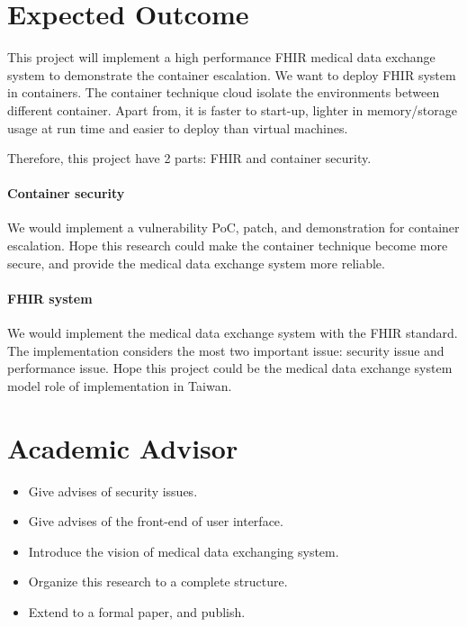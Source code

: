 \documentclass[12pt,a4paper]{IEEEconf}
\begin{document}

\section{Expected Outcome}
This project will implement a high performance FHIR medical data exchange system to demonstrate
the container escalation. We want to deploy FHIR system in containers. The container technique
cloud isolate the environments between different container. Apart from, it is faster to start-up,
lighter in memory/storage usage at run time and easier to deploy than virtual machines.

Therefore, this project have 2 parts: FHIR and container security.
\paragraph{Container security}
We would implement a vulnerability PoC, patch, and demonstration for container escalation.
Hope this research could make the container technique become more secure, and provide the medical
data exchange system more reliable.
\paragraph{FHIR system}
We would implement the medical data exchange system with the FHIR standard. The implementation
considers the most two important issue: security issue and performance issue. Hope this project
could be the medical data exchange system model role of implementation in Taiwan.

\printbibheading[heading=bibnumbered]
\printbibliography\newrefcontext

\section{Academic Advisor}
\begin{itemize}
  \item Give advises of security issues.
  \item Give advises of the front-end of user interface.
  \item Introduce the vision of medical data exchanging system.
  \item Organize this research to a complete structure.
  \item Extend to a formal paper, and publish.
\end{itemize}
\end{document}

